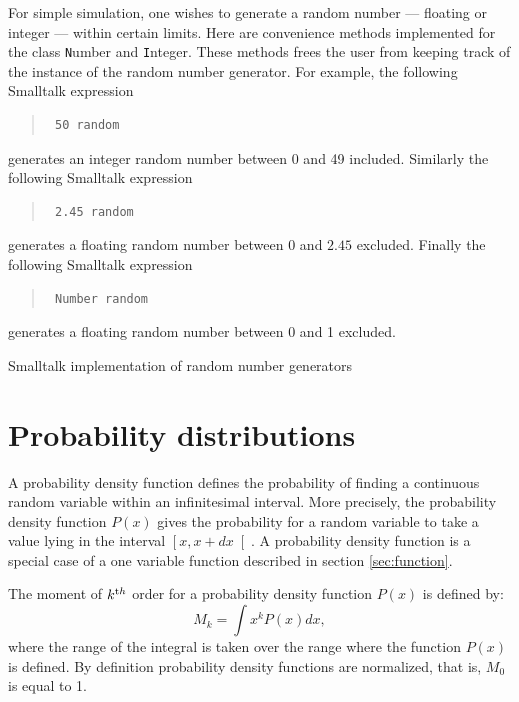 For simple simulation, one wishes to generate a random number ---
floating or integer --- within certain limits. Here are
convenience methods implemented for the class {\texttt Number} and
{\texttt Integer}. These methods frees the user from keeping track of
the instance of the random number generator. For example, the
following Smalltalk expression
\begin{quote}
\begin{verbatim}
 50 random
\end{verbatim}
\end{quote}
\noindent generates an integer random number between 0 and 49
included. Similarly the following Smalltalk expression
\begin{quote}
\begin{verbatim}
 2.45 random
\end{verbatim}
\end{quote}
\noindent generates a floating random number between 0 and $2.45$
excluded. Finally the following Smalltalk expression
\begin{quote}
\begin{verbatim}
 Number random
\end{verbatim}
\end{quote}
\noindent generates a floating random number between 0 and 1
excluded.
\begin{listing} Smalltalk implementation of random number generators
\label{ls:randomuse}


\end{listing}

\section{Probability distributions}
\label{sec:probdistr}A probability density function defines the
probability of finding a continuous random variable within an
infinitesimal interval. More precisely, the probability density
function $P\left(x\right)$ gives the probability for a random
variable to take a value lying in the interval
$\left[x,x+dx\right[$. A probability density function is a special
case of a one variable function described in section
\ref{sec:function}.

The moment of $k^{\mathop{\textrm th}}$ order for a probability
density function $P\left(x\right)$ is defined by:
\begin{equation}
\label{eq:probdensity}
  M_k=\int x^k P\left(x\right) dx,
\end{equation}
where the range of the integral is taken over the range where the
function $P\left(x\right)$ is defined. By definition probability
density functions are normalized, that is, $M_0$ is equal to 1.

